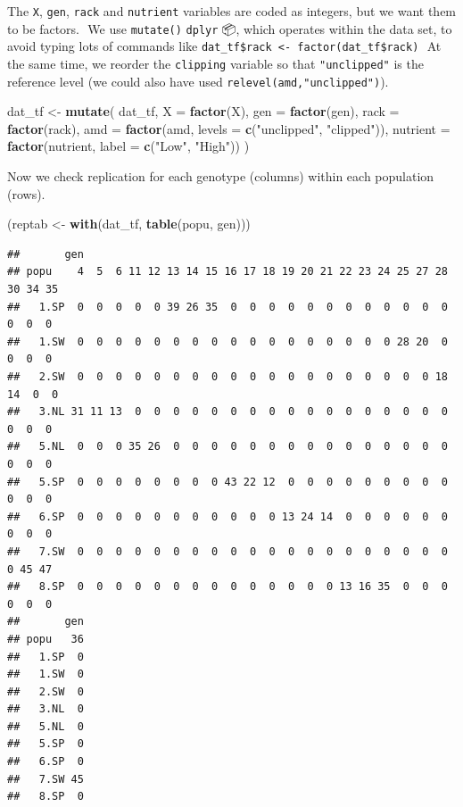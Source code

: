 \documentclass[
  12pt,
]{book}
\newenvironment{Shaded}{\begin{snugshade}}{\end{snugshade}}
\newcommand{\DataTypeTok}[1]{\textcolor[rgb]{0.13,0.29,0.53}{#1}}
\newcommand{\KeywordTok}[1]{\textcolor[rgb]{0.13,0.29,0.53}{\textbf{#1}}}
\newcommand{\NormalTok}[1]{#1}
\newcommand{\StringTok}[1]{\textcolor[rgb]{0.31,0.60,0.02}{#1}}
\begin{document}
The \texttt{X}, \texttt{gen}, \texttt{rack} and \texttt{nutrient} variables are coded as integers, but we want them to be factors.
 We use \texttt{mutate()} \texttt{dplyr} 📦, which operates within the data set, to avoid typing lots of commands like \texttt{dat\_tf\$rack\ \textless{}-\ factor(dat\_tf\$rack)}
 At the same time, we reorder the \texttt{clipping} variable so that \texttt{"unclipped"} is the reference level (we could also have used \texttt{relevel(amd,"unclipped")}).

\begin{Shaded}
\begin{Highlighting}[]
\NormalTok{dat\_tf \textless{}{-}}\StringTok{ }\KeywordTok{mutate}\NormalTok{(}
\NormalTok{  dat\_tf,}
  \DataTypeTok{X =} \KeywordTok{factor}\NormalTok{(X),}
  \DataTypeTok{gen =} \KeywordTok{factor}\NormalTok{(gen),}
  \DataTypeTok{rack =} \KeywordTok{factor}\NormalTok{(rack),}
  \DataTypeTok{amd =} \KeywordTok{factor}\NormalTok{(amd, }\DataTypeTok{levels =} \KeywordTok{c}\NormalTok{(}\StringTok{"unclipped"}\NormalTok{, }\StringTok{"clipped"}\NormalTok{)),}
  \DataTypeTok{nutrient =} \KeywordTok{factor}\NormalTok{(nutrient, }\DataTypeTok{label =} \KeywordTok{c}\NormalTok{(}\StringTok{"Low"}\NormalTok{, }\StringTok{"High"}\NormalTok{))}
\NormalTok{)}
\end{Highlighting}
\end{Shaded}

Now we check replication for each genotype (columns) within each population (rows).

\begin{Shaded}
\begin{Highlighting}[]
\NormalTok{(reptab \textless{}{-}}\StringTok{ }\KeywordTok{with}\NormalTok{(dat\_tf, }\KeywordTok{table}\NormalTok{(popu, gen)))}
\end{Highlighting}
\end{Shaded}

\begin{verbatim}
##       gen
## popu    4  5  6 11 12 13 14 15 16 17 18 19 20 21 22 23 24 25 27 28 30 34 35
##   1.SP  0  0  0  0  0 39 26 35  0  0  0  0  0  0  0  0  0  0  0  0  0  0  0
##   1.SW  0  0  0  0  0  0  0  0  0  0  0  0  0  0  0  0  0 28 20  0  0  0  0
##   2.SW  0  0  0  0  0  0  0  0  0  0  0  0  0  0  0  0  0  0  0 18 14  0  0
##   3.NL 31 11 13  0  0  0  0  0  0  0  0  0  0  0  0  0  0  0  0  0  0  0  0
##   5.NL  0  0  0 35 26  0  0  0  0  0  0  0  0  0  0  0  0  0  0  0  0  0  0
##   5.SP  0  0  0  0  0  0  0  0 43 22 12  0  0  0  0  0  0  0  0  0  0  0  0
##   6.SP  0  0  0  0  0  0  0  0  0  0  0 13 24 14  0  0  0  0  0  0  0  0  0
##   7.SW  0  0  0  0  0  0  0  0  0  0  0  0  0  0  0  0  0  0  0  0  0 45 47
##   8.SP  0  0  0  0  0  0  0  0  0  0  0  0  0  0 13 16 35  0  0  0  0  0  0
##       gen
## popu   36
##   1.SP  0
##   1.SW  0
##   2.SW  0
##   3.NL  0
##   5.NL  0
##   5.SP  0
##   6.SP  0
##   7.SW 45
##   8.SP  0
\end{verbatim}
\end{document}
